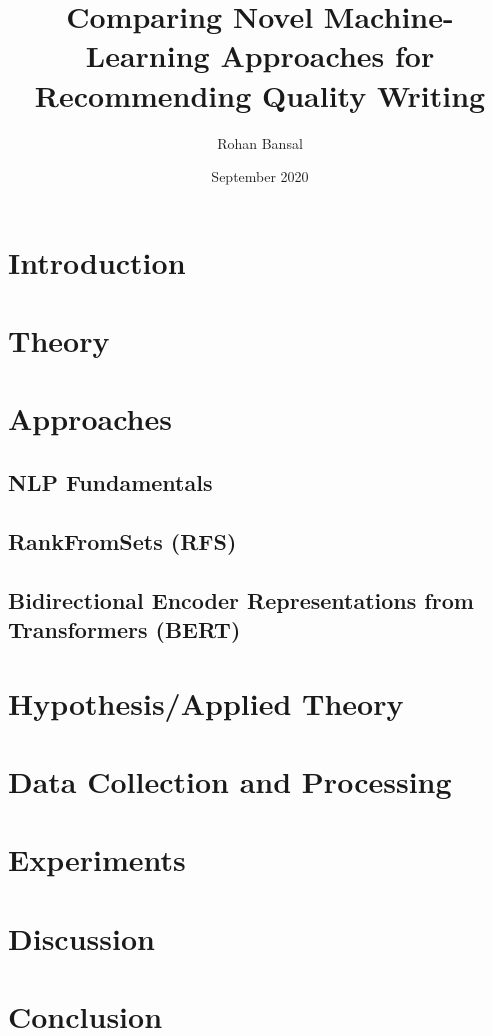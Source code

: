 \documentclass[12pt]{article}
\title{Comparing Novel Machine-Learning Approaches for Recommending Quality Writing}
\author{Rohan Bansal}
\date{September 2020}
\begin{document}


\tableofcontents
\newpage

\section{Introduction}


\section{Theory}


\section{Approaches}

\subsection{NLP Fundamentals}


\subsection{RankFromSets (RFS)}


\subsection{Bidirectional Encoder Representations from Transformers (BERT)}


\section{Hypothesis/Applied Theory}


\section{Data Collection and Processing}


\section{Experiments}


\section{Discussion}


\section{Conclusion}


\newpage

\printbibliography[heading=bibintoc, title={Bibliography}]
\cleardoublepage
\appendix

\end{document}
